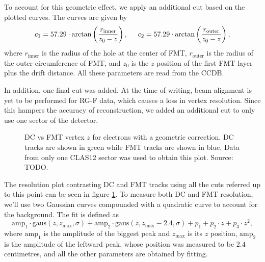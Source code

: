     To account for this geometric effect, we apply an additional cut based on the plotted curves.
    The curves are given by
    \begin{equation} \label{eq::fmt_geometry_cut}
        c_1 = 57.29 \cdot \arctan\left(\frac{r_\text{inner}}{z_0 - z}\right), \hspace{0.5cm}
        c_2 = 57.29 \cdot \arctan\left(\frac{r_\text{outer}}{z_0 - z}\right),
    \end{equation}
    where $r_\text{inner}$ is the radius of the hole at the center of FMT, $r_\text{outer}$ is the radius of the outer circumference of FMT, and $z_0$ is the $z$ position of the first FMT layer plus the drift distance.
    All these parameters are read from the CCDB.

    In addition, one final cut was added.
    At the time of writing, beam alignment is yet to be performed for RG-F data, which causes a loss in vertex resolution.
    Since this hampers the accuracy of reconstruction, we added an additional cut to only use one sector of the detector.

    \begin{figure}[b!]
        \centering{}
        \caption[DC vs FMT $z$ with geometry correction]{DC vs FMT vertex $z$ for electrons with a geometric correction. DC tracks are shown in green while FMT tracks are shown in blue. Data from only one CLAS12 sector was used to obtain this plot.
        Source: TODO.}
        \label{fig::dc_vs_fmt_vz_011983_corrected}
    \end{figure}

    The resolution plot contrasting DC and FMT tracks using all the cuts referred up to this point can be seen in figure \ref{fig::dc_vs_fmt_vz_011983_corrected}.
    To measure both DC and FMT resolution, we'll use two Gaussian curves compounded with a quadratic curve to account for the background.
    The fit is defined as
    \begin{equation*}
        \text{amp}_1 \cdot \text{gaus}(z, z_\text{max}, \sigma) + \text{amp}_2 \cdot \text{gaus}(z, z_\text{max} - 2.4, \sigma) + p_1 + p_2\cdot z + p_3\cdot z^2,
    \end{equation*}
    where $\text{amp}_1$ is the amplitude of the biggest peak and $z_\text{max}$ is its $z$ position, $\text{amp}_2$ is the amplitude of the leftward peak, whose position was measured to be $2.4$ centimetres, and all the other parameters are obtained by fitting.

